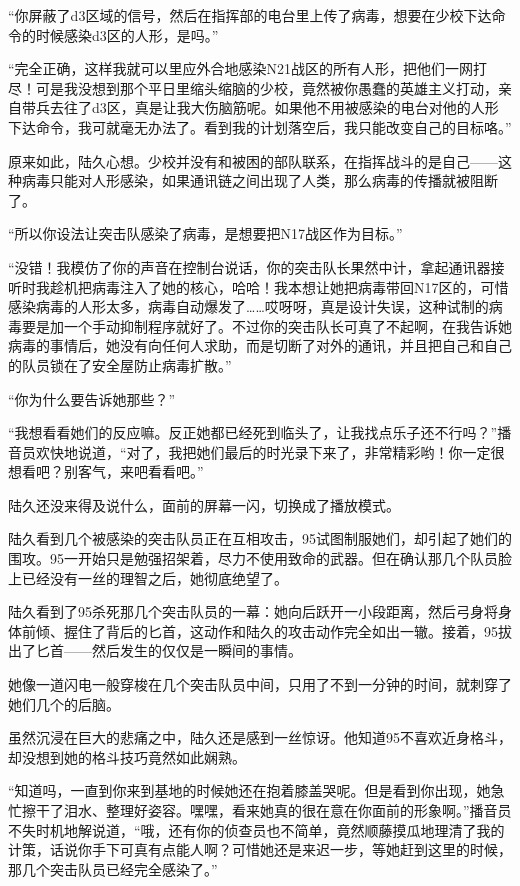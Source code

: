 “你屏蔽了d3区域的信号，然后在指挥部的电台里上传了病毒，想要在少校下达命令的时候感染d3区的人形，是吗。”

“完全正确，这样我就可以里应外合地感染N21战区的所有人形，把他们一网打尽！可是我没想到那个平日里缩头缩脑的少校，竟然被你愚蠢的英雄主义打动，亲自带兵去往了d3区，真是让我大伤脑筋呢。如果他不用被感染的电台对他的人形下达命令，我可就毫无办法了。看到我的计划落空后，我只能改变自己的目标咯。”

原来如此，陆久心想。少校并没有和被困的部队联系，在指挥战斗的是自己——这种病毒只能对人形感染，如果通讯链之间出现了人类，那么病毒的传播就被阻断了。

“所以你设法让突击队感染了病毒，是想要把N17战区作为目标。”

“没错！我模仿了你的声音在控制台说话，你的突击队长果然中计，拿起通讯器接听时我趁机把病毒注入了她的核心，哈哈！我本想让她把病毒带回N17区的，可惜感染病毒的人形太多，病毒自动爆发了……哎呀呀，真是设计失误，这种试制的病毒要是加一个手动抑制程序就好了。不过你的突击队长可真了不起啊，在我告诉她病毒的事情后，她没有向任何人求助，而是切断了对外的通讯，并且把自己和自己的队员锁在了安全屋防止病毒扩散。”

“你为什么要告诉她那些？”

“我想看看她们的反应嘛。反正她都已经死到临头了，让我找点乐子还不行吗？”播音员欢快地说道，“对了，我把她们最后的时光录下来了，非常精彩哟！你一定很想看吧？别客气，来吧看看吧。”

陆久还没来得及说什么，面前的屏幕一闪，切换成了播放模式。

陆久看到几个被感染的突击队员正在互相攻击，95试图制服她们，却引起了她们的围攻。95一开始只是勉强招架着，尽力不使用致命的武器。但在确认那几个队员脸上已经没有一丝的理智之后，她彻底绝望了。

陆久看到了95杀死那几个突击队员的一幕：她向后跃开一小段距离，然后弓身将身体前倾、握住了背后的匕首，这动作和陆久的攻击动作完全如出一辙。接着，95拔出了匕首——然后发生的仅仅是一瞬间的事情。

她像一道闪电一般穿梭在几个突击队员中间，只用了不到一分钟的时间，就刺穿了她们几个的后脑。

虽然沉浸在巨大的悲痛之中，陆久还是感到一丝惊讶。他知道95不喜欢近身格斗，却没想到她的格斗技巧竟然如此娴熟。

“知道吗，一直到你来到基地的时候她还在抱着膝盖哭呢。但是看到你出现，她急忙擦干了泪水、整理好姿容。嘿嘿，看来她真的很在意在你面前的形象啊。”播音员不失时机地解说道，“哦，还有你的侦查员也不简单，竟然顺藤摸瓜地理清了我的计策，话说你手下可真有点能人啊？可惜她还是来迟一步，等她赶到这里的时候，那几个突击队员已经完全感染了。”

